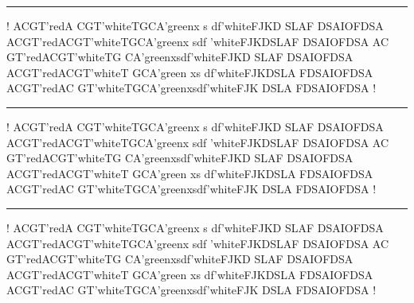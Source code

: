 \documentclass[a4paper]{book}
\begin{document}
\noindent\begin{minipage}{100pt}

\noindent\rule{\textwidth}{.5pt}
\DNA!  ACGT'{red}A CGT'{white}TGCA'{green}x s df'{white}FJKD SLAF
DSAIOFDSA ACGT'{red}ACGT'{white}TGCA'{green}x sdf '{white}FJKDSLAF
DSAIOFDSA AC GT'{red}ACGT'{white}TG CA'{green}xsdf'{white}FJKD SLAF
DSAIOFDSA ACGT'{red}ACGT'{white}T GCA'{green} xs df'{white}FJKDSLA
FDSAIOFDSA ACGT'{red}AC GT'{white}TGCA'{green}xsdf'{white}FJK DSLA
FDSAIOFDSA !
\end{minipage}

\noindent\begin{minipage}{200pt}
\noindent\rule{\textwidth}{.5pt}
\DNA!  ACGT'{red}A CGT'{white}TGCA'{green}x s df'{white}FJKD SLAF
DSAIOFDSA ACGT'{red}ACGT'{white}TGCA'{green}x sdf '{white}FJKDSLAF
DSAIOFDSA AC GT'{red}ACGT'{white}TG CA'{green}xsdf'{white}FJKD SLAF
DSAIOFDSA ACGT'{red}ACGT'{white}T GCA'{green} xs df'{white}FJKDSLA
FDSAIOFDSA ACGT'{red}AC GT'{white}TGCA'{green}xsdf'{white}FJK DSLA
FDSAIOFDSA !
\end{minipage}

\noindent\begin{minipage}{\textwidth}
\noindent\rule{\textwidth}{.5pt}
\DNA!  ACGT'{red}A CGT'{white}TGCA'{green}x s df'{white}FJKD SLAF
DSAIOFDSA ACGT'{red}ACGT'{white}TGCA'{green}x sdf '{white}FJKDSLAF
DSAIOFDSA AC GT'{red}ACGT'{white}TG CA'{green}xsdf'{white}FJKD SLAF
DSAIOFDSA ACGT'{red}ACGT'{white}T GCA'{green} xs df'{white}FJKDSLA
FDSAIOFDSA ACGT'{red}AC GT'{white}TGCA'{green}xsdf'{white}FJK DSLA
FDSAIOFDSA !
\end{minipage}
\end{document}
